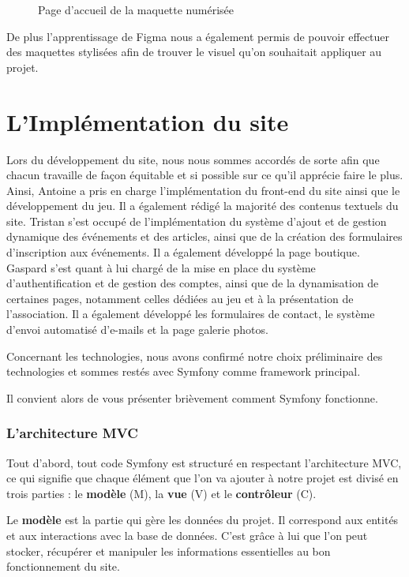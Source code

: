\begin{figure}[H]
    \caption{Page d'accueil de la maquette numérisée}
    \label{fig:enter-label}
\end{figure}

De plus l'apprentissage de Figma nous a également permis de pouvoir effectuer des maquettes stylisées afin de trouver le visuel qu'on souhaitait appliquer au projet.



\section{L'Implémentation du site}

Lors du développement du site, nous nous sommes accordés de sorte afin que chacun travaille de façon équitable et si possible sur ce qu'il apprécie faire le plus. 
Ainsi, Antoine a pris en charge l’implémentation du front-end du site ainsi que le développement du jeu. Il a également rédigé la majorité des contenus textuels du site.  
Tristan s’est occupé de l’implémentation du système d’ajout et de gestion dynamique des événements et des articles, ainsi que de la création des formulaires d’inscription aux événements. Il a également développé la page boutique.  
Gaspard s’est quant à lui chargé de la mise en place du système d’authentification et de gestion des comptes, ainsi que de la dynamisation de certaines pages, notamment celles dédiées au jeu et à la présentation de l’association. Il a également développé les formulaires de contact, le système d’envoi automatisé d’e-mails et la page galerie photos.

Concernant les technologies, nous avons confirmé notre choix préliminaire des technologies et sommes restés avec Symfony comme framework principal.

Il convient alors de vous présenter brièvement comment Symfony fonctionne.

\subsubsection*{L'architecture MVC}

Tout d'abord, tout code Symfony est structuré en respectant l'architecture MVC, ce qui signifie que chaque élément que l'on va ajouter à notre projet est divisé en trois parties : le \textbf{modèle} (M), la \textbf{vue} (V) et le \textbf{contrôleur} (C). 

Le \textbf{modèle} est la partie qui gère les données du projet. Il correspond aux entités et aux interactions avec la base de données. C’est grâce à lui que l’on peut stocker, récupérer et manipuler les informations essentielles au bon fonctionnement du site.

